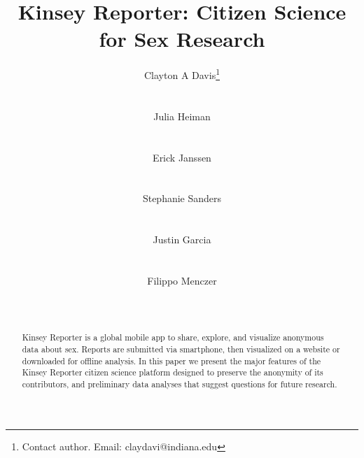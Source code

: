 \documentclass{sigchi}
\begin{document}
\title{Kinsey Reporter: Citizen Science for Sex Research}

\author{
  \alignauthor Clayton A Davis\thanks{Contact author. Email: claydavi@indiana.edu}\\
    \\
    \\
  \alignauthor Julia Heiman\\
    \\
    \\  
  \alignauthor Erick Janssen\\
    \\
    \\
  \alignauthor Stephanie Sanders\\
    \\
    \\ 
  \alignauthor Justin Garcia\\
    \\
    \\ 
  \alignauthor Filippo Menczer\\
    \\
    \\ 
}

\maketitle

\begin{abstract}
Kinsey Reporter is a global mobile app to share, explore, and visualize anonymous data about sex. Reports are submitted via smartphone, then visualized on a website or downloaded for offline analysis. 
In this paper we present the major features of the Kinsey Reporter citizen science platform designed to preserve the anonymity of its contributors, and preliminary data analyses that suggest questions for future research.
\end{abstract}
\end{document}
